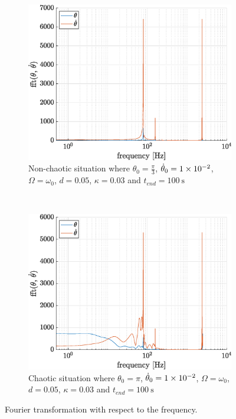 \documentclass[a4paper,12pt,twoside]{article}
\begin{document}
\begin{figure}[h!]
\begin{subfigure}[t]{0.48\textwidth}
	\includegraphics[width=\textwidth]{graphs/g_fourier_non_chaotic.eps}
	\caption{Non-chaotic situation where $\theta_0 = \frac{\pi}{3}$, $\dot{\theta}_0 = \num{1d-2}$, $\Omega = \omega_0$, $d=0.05$, $\kappa=0.03$ and $t_{end} = \SI{100}{\s}$}
	\label{fig:g-fourier-fft-non-chaotic}
\end{subfigure}
~
\begin{subfigure}[t]{0.48\textwidth}
	\includegraphics[width=\textwidth]{graphs/g_fourier_chaotic.eps}
	\caption{Chaotic situation where $\theta_0 = \pi$, $\dot{\theta}_0 = \num{1d-2}$, $\Omega = \omega_0$, $d=0.05$, $\kappa=0.03$ and $t_{end} = \SI{100}{\s}$}
	\label{fig:g-fourier-fft-chaotic}
\end{subfigure}
\caption{Fourier transformation with respect to the frequency.}
\label{fig:g-fourier-fft}
\end{figure}
\end{document}
